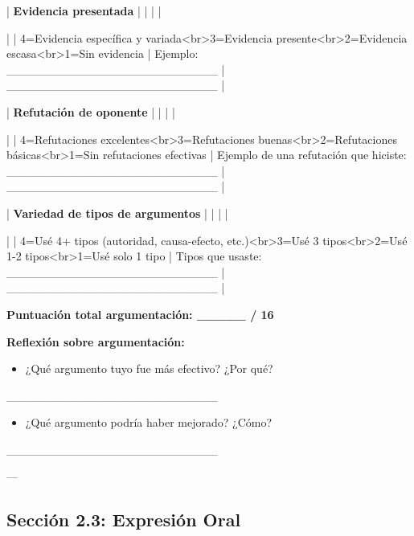 \documentclass[a4paper,11pt]{article}
\begin{document}
| \textbf{Evidencia presentada} | | | |

| | 4=Evidencia específica y variada<br>3=Evidencia presente<br>2=Evidencia escasa<br>1=Sin evidencia | Ejemplo: _________________________ | _________________________ |

| \textbf{Refutación de oponente} | | | |

| | 4=Refutaciones excelentes<br>3=Refutaciones buenas<br>2=Refutaciones básicas<br>1=Sin refutaciones efectivas | Ejemplo de una refutación que hiciste: _________________________ | _________________________ |

| \textbf{Variedad de tipos de argumentos} | | | |

| | 4=Usé 4+ tipos (autoridad, causa-efecto, etc.)<br>3=Usé 3 tipos<br>2=Usé 1-2 tipos<br>1=Usé solo 1 tipo | Tipos que usaste: _________________________ | _________________________ |

\vspace{0.2cm}

\textbf{Puntuación total argumentación: _____ / 16}

\vspace{0.2cm}

\textbf{Reflexión sobre argumentación:}

\begin{itemize}

  \item ¿Qué argumento tuyo fue más efectivo? ¿Por qué?

\end{itemize}

_________________________

\begin{itemize}

  \item ¿Qué argumento podría haber mejorado? ¿Cómo?

\end{itemize}

_________________________

\vspace{0.2cm}

---

\vspace{0.2cm}

\subsection{Sección 2.3: Expresión Oral}

\vspace{0.2cm}
\end{document}
